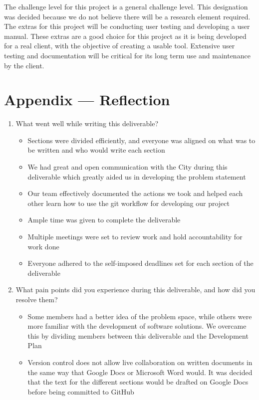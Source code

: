 \documentclass{article}
\begin{document}
The challenge level for this project is a general challenge level. This designation was decided because we do
not believe there will be a research element required. The extras for this project will be conducting user
testing and developing a user manual. These extras are a good choice for this project as it is being developed
for a real client, with the objective of creating a usable tool. Extensive user testing and documentation will be
critical for its long term use and maintenance by the client.

\newpage{}

\section*{Appendix --- Reflection}

\begin{enumerate}
  \item What went well while writing this deliverable?
  
\begin{itemize}
\item Sections were divided efficiently, and everyone was aligned on what was to be written and who would
write each section
\item We had great and open communication with the City during this deliverable which greatly aided us in
developing the problem statement
\item Our team effectively documented the actions we took and helped each other learn how to use the git
workflow for developing our project
\item Ample time was given to complete the deliverable
\item Multiple meetings were set to review work and hold accountability for work done
\item Everyone adhered to the self-imposed deadlines set for each section of the deliverable
\end{itemize}

  \item What pain points did you experience during this deliverable, and how
    did you resolve them?
  \begin{itemize}
  \item Some members had a better idea of the problem space, while others were more familiar with the
  development of software solutions. We overcame this by dividing members between this deliverable
  and the Development Plan
  \item Version control does not allow live collaboration on written documents in the same way that Google
  Docs or Microsoft Word would. It was decided that the text for the different sections would be drafted
  on Google Docs before being committed to GitHub  
  \end{itemize}


\end{enumerate}
\end{document}
